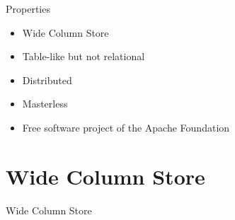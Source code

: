 \documentclass[
  10pt
]{beamer}
\begin{document}
\begin{frame}{Properties}
  \begin{itemize}
    \item<1-> Wide Column Store
    \item<2-> Table-like but not relational
    \item<3-> Distributed
    \item<4-> Masterless
    \item<5-> Free software project of the Apache Foundation
  \end{itemize}
\end{frame}

\section{Wide Column Store}  %
\begin{frame}{Wide Column Store}
\end{frame}
\end{document}
